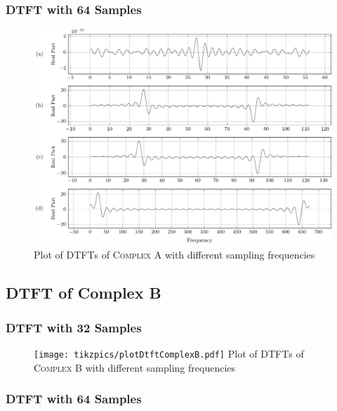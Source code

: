 \documentclass[../../course]{subfiles}
\begin{document}
\subsubsection{DTFT with 64 Samples}

\begin{figure} [H]
    \centering
     {
        \includegraphics[height = 0.8\textheight] {tikzpics/plotDtftComplexA64.pdf}
    }
     {Plot of \textsc{DTFT}s of \textsc{Complex A} with different sampling frequencies}
    \label{plt:dtftComplexA}
\end{figure}


\subsection{DTFT of Complex B} \label{ssec:dtftCplxB}

\subsubsection{DTFT with 32 Samples}

\begin{figure} [H]
    \centering
     {
        \texttt{[image: tikzpics/plotDtftComplexB.pdf]}
    }
     {Plot of \textsc{DTFT}s of \textsc{Complex B} with different sampling frequencies}
    \label{plt:dtftComplexB}
\end{figure}

\subsubsection{DTFT with 64 Samples}
\end{document}
